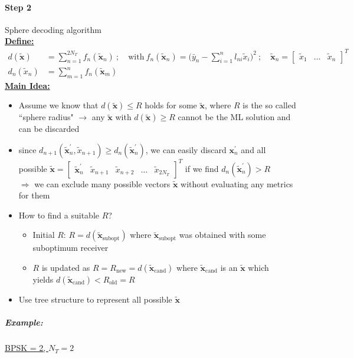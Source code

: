 \documentclass[a4paper, 10pt]{article}
\begin{document}
\paragraph{Step 2}
Sphere decoding algorithm\\ 
\underline{\textbf{Define:}}
\begin{align*}
	 d(\tilde{\mathbf{x}}) &= \sum_{n = 1}^{2N_T} f_n(\tilde{\mathbf{x}}_n) \ ;\quad \text{with}\ f_n(\tilde{\mathbf{x}}_n) = \bigl (\bar{y}_n - \sum_{i = 1}^{n}l_{ni}\tilde{x}_i\bigr)^2\ ;\quad \tilde{\mathbf{x}}_n = 
	 \begin{bmatrix}
	 	\tilde{x}_1 & \ldots & \tilde{x}_n
	 \end{bmatrix}^T \\
	 d_n(\tilde{x}_n) &= \sum_{m = 1}^{n} f_n(\tilde{\mathbf{x}}_m)
\end{align*}
\underline{\textbf{Main Idea:}}
\begin{itemize}
	\item Assume we know that $ d(\tilde{\mathbf{x}}) \leq R $ holds for some $\tilde{\mathbf{x}} $, where $ R $ is the so called ``sphere radius" \quad	$\rightarrow$ any $ \tilde{\mathbf{x}} $ with $ d(\tilde{\mathbf{x}}) \geq R $ cannot be the ML solution and can be discarded
	\item since $ d_{n + 1}(\tilde{\mathbf{x}}_n^\prime, \tilde{x}_{n + 1}) \geq d_n(\tilde{\mathbf{x}}_n^\prime) $, we can easily discard $ \mathbf{x}_n^\prime $ and all \\ possible $ \tilde{\mathbf{x}} = \begin{bmatrix}
	\tilde{\mathbf{x}}_n^{\prime} & \tilde{x}_{n+1} & \tilde{x}_{n+2} & \ldots & \tilde{x}_{2N_T} \end{bmatrix}^T $ if we find $ d_n(\tilde{\mathbf{x}}_n^\prime) > R \quad $ \\ $ \Rightarrow $ we can exclude many possible vectors $\tilde{\mathbf{x}} $ without evaluating  any metrics for them 
	\item How to find a suitable $R$?
	\begin{itemize}
		\item Initial $R$: $R = d(\tilde{\mathbf{x}}_{\text{subopt}}) $ where $ \tilde{\mathbf{x}}_{\text{subopt}} $ was obtained with some suboptimum receiver
		\item $R $ is updated as $ R = R_{\text{new}} = d(\tilde{\mathbf{x}}_{\text{cand}}) $ where $ \tilde{\mathbf{x}}_{\text{cand}} $ is an $ \tilde{\mathbf{x}} $ which \\ yields  $ d(\tilde{\mathbf{x}}_{\text{cand}}) < R_{\text{old}} = R $
	\end{itemize}
	\item Use tree structure to represent all possible $\tilde{\mathbf{x}} $ 
\end{itemize}
\subparagraph{Example:}	
\underline{ BPSK = 2, $N_T = 2$}\\
\end{document}
